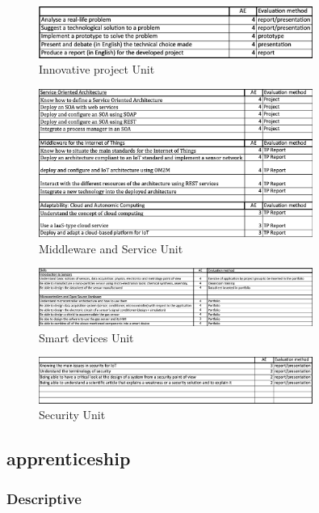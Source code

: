 \begin{figure}[!ht]
    \centering
    \includegraphics[width=0.8\textwidth]{image/Innovativ project.png}
    \caption{Innovative project Unit}
    \label{fig:Innovativ project}
\end{figure}
\begin{figure}[!ht]
    \centering
    \includegraphics[width=0.8\textwidth]{image/Middleware and Service.png}
    \caption{Middleware and Service Unit}
    \label{fig:Middleware and Service}
\end{figure}
\begin{figure}[!ht]
    \centering
    \includegraphics[width=0.8\textwidth]{image/Smart devices.png}
    \caption{Smart devices Unit}
    \label{fig:Smart devices}
\end{figure}
\newpage
\begin{figure}[H]
    \centering
    \includegraphics[width=0.8\textwidth]{image/Security.png}
    \caption{Security Unit}
    \label{fig:Security}
\end{figure}


\subsection{apprenticeship}

\subsubsection{Descriptive}
